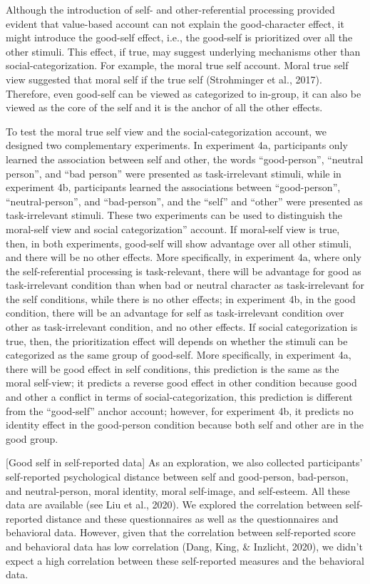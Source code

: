 \documentclass[
  man]{apa6}
\begin{document}
Although the introduction of self- and other-referential processing provided evident that value-based account can not explain the good-character effect, it might introduce the good-self effect, i.e., the good-self is prioritized over all the other stimuli. This effect, if true, may suggest underlying mechanisms other than social-categorization. For example, the moral true self account. Moral true self view suggested that moral self if the true self (Strohminger et al., 2017). Therefore, even good-self can be viewed as categorized to in-group, it can also be viewed as the core of the self and it is the anchor of all the other effects.

To test the moral true self view and the social-categorization account, we designed two complementary experiments. In experiment 4a, participants only learned the association between self and other, the words ``good-person'', ``neutral person'', and ``bad person'' were presented as task-irrelevant stimuli, while in experiment 4b, participants learned the associations between ``good-person'', ``neutral-person'', and ``bad-person'', and the ``self'' and ``other'' were presented as task-irrelevant stimuli. These two experiments can be used to distinguish the moral-self view and social categorization'' account. If moral-self view is true, then, in both experiments, good-self will show advantage over all other stimuli, and there will be no other effects. More specifically, in experiment 4a, where only the self-referential processing is task-relevant, there will be advantage for good as task-irrelevant condition than when bad or neutral character as task-irrelevant for the self conditions, while there is no other effects; in experiment 4b, in the good condition, there will be an advantage for self as task-irrelevant condition over other as task-irrelevant condition, and no other effects. If social categorization is true, then, the prioritization effect will depends on whether the stimuli can be categorized as the same group of good-self. More specifically, in experiment 4a, there will be good effect in self conditions, this prediction is the same as the moral self-view; it predicts a reverse good effect in other condition because good and other a conflict in terms of social-categorization, this prediction is different from the ``good-self'' anchor account; however, for experiment 4b, it predicts no identity effect in the good-person condition because both self and other are in the good group.

{[}Good self in self-reported data{]}
As an exploration, we also collected participants' self-reported psychological distance between self and good-person, bad-person, and neutral-person, moral identity, moral self-image, and self-esteem. All these data are available (see Liu et al., 2020). We explored the correlation between self-reported distance and these questionnaires as well as the questionnaires and behavioral data. However, given that the correlation between self-reported score and behavioral data has low correlation (Dang, King, \& Inzlicht, 2020), we didn't expect a high correlation between these self-reported measures and the behavioral data.
\end{document}
